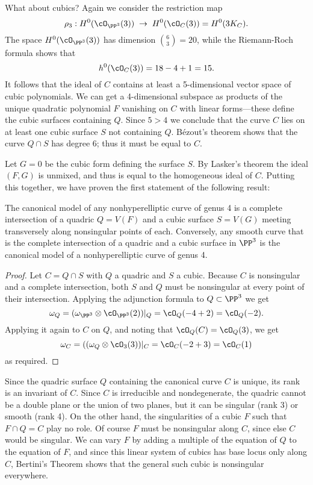 What about cubics? Again we consider the restriction map
$$
\rho_3 : H^0(\cO_{\PP^3}(3)) \; \to \; H^0(\cO_{C}(3)) = H^0(3K_C).
$$
The space $H^0(\cO_{\PP^3}(3))$ has dimension $\binom{6}{3} = 20$, while  the Riemann-Roch formula shows that
$$
h^0(\cO_C(3)) = 18 - 4 + 1 = 15.
$$
It follows that the ideal of $C$ contains at least a 5-dimensional vector space of cubic polynomials. We can get a 4-dimensional subspace as products of the unique quadratic polynomial $F$ vanishing on $C$ with linear forms---these define the cubic surfaces containing $Q$. Since $5 > 4$ we  conclude that the curve $C$ lies on at least one cubic surface $S$  not containing $Q$. 
B\'ezout's theorem shows that the curve $Q \cap S$ has degree 6; thus it must be equal to $C$. 

Let $G=0$ be the cubic form defining the surface $S$. By Lasker's theorem the ideal $(F,G)$ is unmixed, and thus is equal to the homogeneous ideal of $C$. Putting this together, we have proven the first statement of the following result:

\begin{theorem}
The canonical model of any nonhyperelliptic curve of genus 4 is a complete intersection of a quadric $Q = V(F)$ and a cubic surface $S = V(G)$ meeting transversely along nonsingular points of each. Conversely, any smooth curve that is the complete intersection of a quadric and a cubic surface in $\PP^3$ is the canonical model of a nonhyperelliptic curve of genus 4.
\end{theorem}
 
\begin{proof}
Let $C = Q\cap S$ with $Q$ a quadric and $S$ a cubic. Because $C$ is nonsingular and a complete intersection, both $S$ and $Q$ must be nonsingular at every point of their intersection. Applying the adjunction formula to $Q\subset \PP^3$ we get
$$
\omega_Q = (\omega_{\PP^3} \otimes \cO_{\PP^3}(2))|_Q = \cO_Q(-4+2) = \cO_Q(-2).
$$
Applying it again to $C$ on $Q$, and noting that $\cO_Q(C) = \cO_Q(3)$, we get
$$
\omega_C = ((\omega_{Q} \otimes \cO_{3}(3))|_C = \cO_C(-2+3) = \cO_C(1)
$$
as required. 
\end{proof}

Since the quadric surface $Q$ containing the canonical curve $C$  is unique, its rank is an invariant of $C$.
Since $C$ is irreducible and nondegenerate, the quadric cannot be a double plane or the union of two planes, but it can be singular (rank 3) or smooth (rank 4). On the other hand, the singularities of a cubic $F$ such that $F\cap Q = C$ play no role. Of course $F$ must be nonsingular along $C$, since else 
$C$ would be singular. We can vary $F$ by adding a multiple of the equation of $Q$ to the equation of $F$, and since this linear system of cubics has base locus only along $C$, Bertini's Theorem shows that the general such cubic is nonsingular everywhere.

